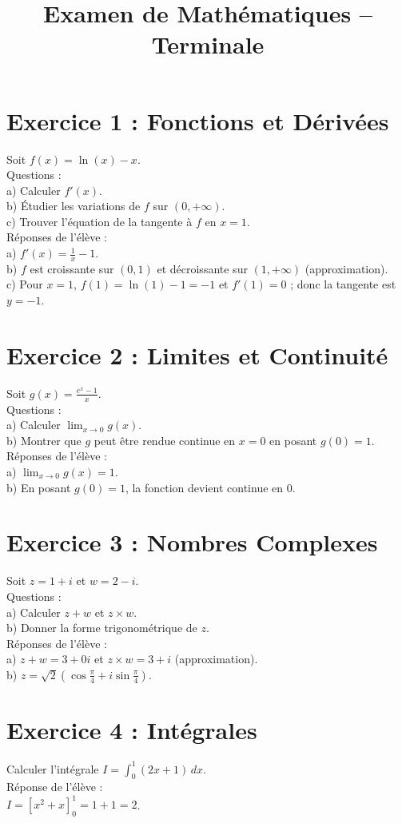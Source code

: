 \documentclass{article}
\begin{document}
\title{Examen de Mathématiques – Terminale}
\maketitle

\section*{Exercice 1 : Fonctions et Dérivées}
Soit $f(x) = \ln(x) - x$.\\
Questions :\\
a) Calculer $f'(x)$.\\
b) Étudier les variations de $f$ sur $(0,+\infty)$.\\
c) Trouver l’équation de la tangente à $f$ en $x = 1$.\\
Réponses de l’élève :\\
a) $f'(x) = \frac{1}{x} - 1$.\\
b) $f$ est croissante sur $(0,1)$ et décroissante sur $(1,+\infty)$ (approximation).\\
c) Pour $x = 1$, $f(1) = \ln(1) - 1 = -1$ et $f'(1) = 0$ ; donc la tangente est $y = -1$.

\section*{Exercice 2 : Limites et Continuité}
Soit $g(x) = \frac{e^x - 1}{x}$.\\
Questions :\\
a) Calculer $\lim_{x \to 0} g(x)$.\\
b) Montrer que $g$ peut être rendue continue en $x = 0$ en posant $g(0) = 1$.\\
Réponses de l’élève :\\
a) $\lim_{x \to 0} g(x) = 1$.\\
b) En posant $g(0) = 1$, la fonction devient continue en $0$.

\section*{Exercice 3 : Nombres Complexes}
Soit $z = 1 + i$ et $w = 2 - i$.\\
Questions :\\
a) Calculer $z + w$ et $z \times w$.\\
b) Donner la forme trigonométrique de $z$.\\
Réponses de l’élève :\\
a) $z + w = 3 + 0i$ et $z \times w = 3 + i$ (approximation).\\
b) $z = \sqrt{2} \left( \cos\frac{\pi}{4} + i\sin\frac{\pi}{4} \right)$.

\section*{Exercice 4 : Intégrales}
Calculer l’intégrale $I = \int_0^1 (2x + 1) \, dx$.\\
Réponse de l’élève :\\
$I = \left[ x^2 + x \right]_0^1 = 1 + 1 = 2$.
\end{document}
